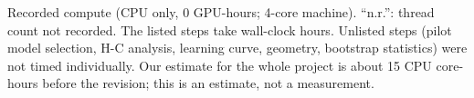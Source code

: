 \begin{table}[h]
\centering\footnotesize\setlength{\tabcolsep}{3pt}

\caption{Recorded compute (CPU only, 0 GPU-hours; 4-core machine). ``n.r.'': thread count not recorded. The listed steps take \computeListedHours{} wall-clock hours. Unlisted steps (pilot model selection, H-C analysis, learning curve, geometry, bootstrap statistics) were not timed individually. Our estimate for the whole project is about 15 CPU core-hours before the revision; this is an estimate, not a measurement.}
\label{tab:compute}
\end{table}
